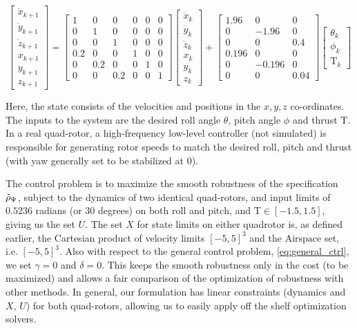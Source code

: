 {\tiny
\begin{equation}
\begin{bmatrix} \dot{x}_{k+1} \\ \dot{y}_{k+1} \\ \dot{z}_{k+1} \\ x_{k+1} \\ y_{k+1} \\ z_{k+1} \end{bmatrix}= \begin{bmatrix} 1&0&0&0&0&0 \\0&1&0&0&0&0 \\0&0&1&0&0&0 \\0.2&0&0&1&0&0 \\0&0.2&0&0&1&0 \\0&0&0.2&0&0&1\end{bmatrix} \begin{bmatrix} \dot{x}_{k} \\ \dot{y}_{k} \\ \dot{z}_{k} \\ x_{k} \\ y_{k} \\ z_{k} \end{bmatrix} + \begin{bmatrix} 1.96&0&0 \\ 0&-1.96&0 \\0&0&0.4 \\0.196&0&0 \\0&-0.196&0\\0&0&0.04 \end{bmatrix} \begin{bmatrix} \theta_k \\ \phi_k \\ \text{T}_k \end{bmatrix}
\end{equation}
}

Here, the state consists of the velocities and positions in the $x,y,z$ co-ordinates. The inputs to the system are the desired roll angle $\theta$, pitch angle $\phi$ and thrust $\text{T}$. In a real quad-rotor, a high-frequency low-level controller (not simulated) is responsible for generating rotor speeds to match the desired roll, pitch and thrust (with yaw generally set to be stabilized at $0$). 

The control problem is to maximize the smooth robustness of the specification $\tilde{\rho}_{\Psi}$, subject to the dynamics of two identical quad-rotors, and input limits of $0.5236$ radians (or $30$ degrees) on both roll and pitch, and $\text{T}\in[-1.5,1.5]$, giving us the set $U$. The set $X$ for state limits on either quadrotor is, as defined earlier, the Cartesian product of velocity limits $[-5,5]^3$ and the $\text{Airspace}$ set, i.e. $[-5,5]^3$. Also with respect to the general control problem, \eqref{eq:general_ctrl}, we set $\gamma=0$ and $\delta=0$. This keeps the smooth robustness only in the cost (to be maximized) and allows a fair comparison of the optimization of robustness with other methods. In general, our formulation has linear constraints (dynamics and $X$, $U$) for both quad-rotors, allowing us to easily apply off the shelf optimization solvers.


